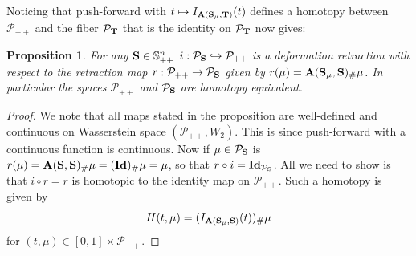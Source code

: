 \documentclass{amsart}
\numberwithin{equation}{section}
\newcommand\cP{{\mathcal P}}
\newcommand\bA{{\bf A}}
\newcommand\bS{{\bf S}}
\newcommand\bT{{\bf T}}
\newcommand\id{{\operatorname{\bf Id}}}
\theoremstyle{plain}
\newtheorem{proposition}[subsection]{Proposition}
\theoremstyle{definition}
\begin{document}
Noticing that push-forward with $t \mapsto I_{\bA(\bS_{\mu}, \bT)}(t)$ defines a homotopy between $\cP_{++}$ and the fiber $\cP_{\bT}$ that 
is the identity on $\cP_{\bT}$ now gives: 
\begin{proposition}
For any $\bS \in {\mathbb S}^n_{++}$ $i:\cP_{\bS} \hookrightarrow \cP_{++}$ is a deformation retraction with 
respect to the retraction map $r: \cP_{++} \rightarrow \cP_{\bS}$ given by $r(\mu)=\bA(\bS_{\mu}, \bS)_{\#}\mu$. 
In particular the spaces $\cP_{++}$ and $\cP_{\bS}$ are homotopy equivalent.       
\end{proposition}
\begin{proof}
We note that all maps stated in the proposition are well-defined and continuous on Wasserstein space $(\cP_{++}, W_2)$. 
This is since push-forward with a continuous function is continuous.       
Now if $\mu \in \cP_{{\bS}}$ is $r(\mu)=\bA(\bS, \bS)_{\#}\mu=({\bf \id})_{\#}\mu=\mu$, so that  
$r \circ i = \id_{\cP_{{\bS}}}$.  All we need to show  is that $i \circ r = r$ is homotopic to the identity map on 
$\cP_{++}$. Such a homotopy is given by 
$$ H(t,\mu)= (I_{\bA(\bS_{\mu}, \bS)}(t))_{\#}\mu $$
for $(t, \mu) \in [0,1] \times \cP_{++}$. 
\end{proof}
\end{document}
